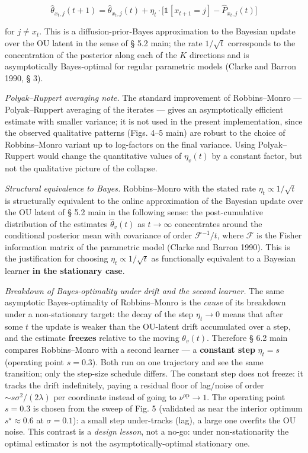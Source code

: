 \documentclass[pdflatex,sn-mathphys-ay]{sn-jnl}
\begin{document}
\[\hat\theta_{x_t,j}(t+1) = \hat\theta_{x_t,j}(t) + \eta_t \cdot \bigl[\mathbb{1}[x_{t+1} = j] - \hat P_{x_t,j}(t)\bigr]\]



for \(j \ne x_t\). This is a diffusion-prior-Bayes approximation to the Bayesian update over the OU latent in the sense of § 5.2 main; the rate \(1/\sqrt{t}\) corresponds to the concentration of the posterior along each of the \(K\) directions and is asymptotically Bayes-optimal for regular parametric models (Clarke and Barron 1990, § 3).



\emph{Polyak--Ruppert averaging note.} The standard improvement of Robbins--Monro --- Polyak--Ruppert averaging of the iterates --- gives an asymptotically efficient estimate with smaller variance; it is not used in the present implementation, since the observed qualitative patterns (Figs. 4--5 main) are robust to the choice of Robbins--Monro variant up to log-factors on the final variance. Using Polyak--Ruppert would change the quantitative values of \(\eta_v(t)\) by a constant factor, but not the qualitative picture of the collapse.



\emph{Structural equivalence to Bayes.} Robbins--Monro with the stated rate \(\eta_t \propto 1/\sqrt{t}\) is structurally equivalent to the online approximation of the Bayesian update over the OU latent of § 5.2 main in the following sense: the post-cumulative distribution of the estimates \(\hat\theta_v(t)\) as \(t \to \infty\) concentrates around the conditional posterior mean with covariance of order \(\mathcal{F}^{-1}/t\), where \(\mathcal{F}\) is the Fisher information matrix of the parametric model (Clarke and Barron 1990). This is the justification for choosing \(\eta_t \propto 1/\sqrt{t}\) as functionally equivalent to a Bayesian learner \textbf{in the stationary case}.



\emph{Breakdown of Bayes-optimality under drift and the second learner.} The same asymptotic Bayes-optimality of Robbins--Monro is the \emph{cause} of its breakdown under a non-stationary target: the decay of the step \(\eta_t \to 0\) means that after some \(t\) the update is weaker than the OU-latent drift accumulated over a step, and the estimate \textbf{freezes} relative to the moving \(\theta_v(t)\). Therefore § 6.2 main compares Robbins--Monro with a second learner --- a \textbf{constant step} \(\eta_t = s\) (operating point \(s = 0.3\)). Both run on one trajectory and see the same transition; only the step-size schedule differs. The constant step does not freeze: it tracks the drift indefinitely, paying a residual floor of lag/noise of order \(\sim s\sigma^2/(2\lambda)\) per coordinate instead of going to \(\nu^{\text{op}} \to 1\). The operating point \(s = 0.3\) is chosen from the sweep of Fig. 5 (validated as near the interior optimum \(s^\star \approx 0.6\) at \(\sigma = 0.1\)): a small step under-tracks (lag), a large one overfits the OU noise. This contrast is a \emph{design lesson}, not a no-go: under non-stationarity the optimal estimator is not the asymptotically-optimal stationary one.
\end{document}
